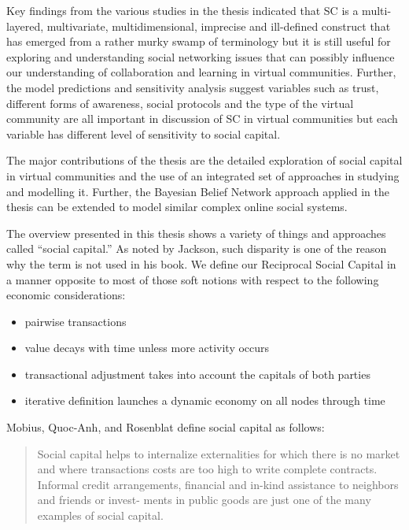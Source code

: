 \documentclass[10pt,oneside]{memoir}
\begin{document}
Key findings from the various studies in the thesis indicated that SC is a multi-layered, multivariate, multidimensional, imprecise and ill-defined construct that has emerged from a rather murky swamp of terminology but it is still useful for exploring and understanding social networking issues that can possibly influence our understanding of collaboration and learning in virtual communities. Further, the model predictions and sensitivity analysis suggest variables such as trust, different forms of awareness, social protocols and the type of the virtual community are all important in discussion of SC in virtual communities but each variable has different level of sensitivity to social capital.


The major contributions of the thesis are the detailed exploration of social capital in virtual communities and the use of an integrated set of approaches in studying and modelling it. Further, the Bayesian Belief Network approach applied in the thesis can be extended to model similar complex online social systems.


The overview presented in this thesis shows a variety of things and approaches called ``social capital.''  As noted by Jackson, such disparity is one of the reason why the term is not used in his book.  We define our Reciprocal Social Capital in a manner opposite to most of those soft notions with respect to the following economic considerations:


\begin{itemize}


\item pairwise transactions

\item value decays with time unless more activity occurs

\item transactional adjustment takes into account the capitals of both parties

\item iterative definition launches a dynamic economy on all nodes through time 
\end{itemize}

Mobius, Quoc-Anh, and Rosenblat \cite{Mobius:2004:Capital} define social capital as follows:


\begin{quote}
Social capital helps to internalize externalities for which there is no market and where transactions costs are too high to write complete contracts. Informal credit arrangements, financial and in-kind assistance to neighbors and friends or invest- ments in public goods are just one of the many examples of social capital.
\end{quote}
\end{document}
